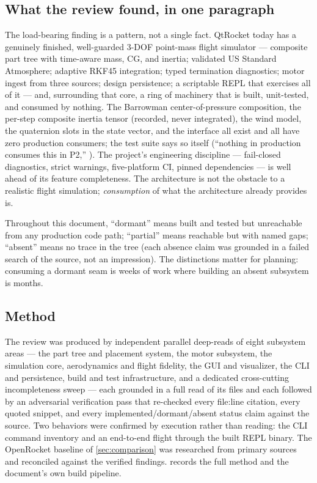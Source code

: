 \subsection{What the review found, in one paragraph}

The load-bearing finding is a pattern, not a single fact. QtRocket today has a genuinely
finished, well-guarded 3-DOF point-mass flight simulator --- composite part tree with
time-aware mass, CG, and inertia; validated US Standard Atmosphere; adaptive RKF45
integration; typed termination diagnostics; motor ingest from three sources; design
persistence; a scriptable REPL that exercises all of it --- and, surrounding that core, a
ring of machinery that is built, unit-tested, and consumed by nothing. The Barrowman
center-of-pressure composition, the per-step composite inertia tensor (recorded, never integrated), the wind model,
the quaternion slots in the state vector, and the  interface all
exist and all have zero production consumers; the test suite says so itself
(``nothing in production consumes this in P2,'' ).
The project's engineering discipline --- fail-closed diagnostics, strict warnings,
five-platform CI, pinned dependencies --- is well ahead of its feature completeness. The
architecture is not the obstacle to a realistic flight simulation; \emph{consumption} of
what the architecture already provides is.

\begin{keyinsight}
Throughout this document, ``dormant'' means built and tested but unreachable from any
production code path; ``partial'' means reachable but with named gaps; ``absent'' means
no trace in the tree (each absence claim was grounded in a failed search of the source,
not an impression). The distinctions matter for planning: consuming a dormant seam is
weeks of work where building an absent subsystem is months.
\end{keyinsight}

\subsection{Method}

The review was produced by independent parallel deep-reads of eight subsystem areas ---
the part tree and placement system, the motor subsystem, the simulation core,
aerodynamics and flight fidelity, the GUI and visualizer, the CLI and persistence, build
and test infrastructure, and a dedicated cross-cutting incompleteness sweep --- each
grounded in a full read of its files and each followed by an adversarial verification
pass that re-checked every file:line citation, every quoted snippet, and every
implemented/dormant/absent status claim against the source. Two behaviors were
confirmed by execution rather than reading: the CLI command inventory and an end-to-end
flight through the built REPL binary. The OpenRocket baseline of \cref{sec:comparison}
was researched from primary sources and reconciled against the verified findings.
 records the full method and the document's own build pipeline.

